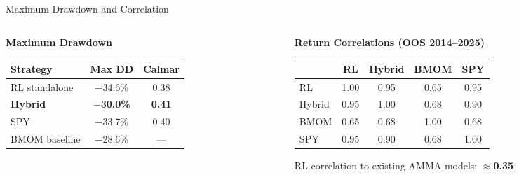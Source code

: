 \documentclass[aspectratio=169,11pt]{beamer}
\begin{document}
\begin{frame}{Maximum Drawdown and Correlation}
  \vspace{0.5em}
  \begin{columns}[T]
    \begin{column}{0.48\textwidth}
      \textbf{Maximum Drawdown}\\[0.4em]
      \begin{center}
      \begin{tabular}{lcc}
        \toprule
        Strategy & Max DD & Calmar \\
        \midrule
        RL standalone & $-$34.6\% & 0.38 \\
        \rowcolor{green!8}
        \textbf{Hybrid} & $-$\textbf{30.0\%} & \textbf{0.41} \\
        SPY & $-$33.7\% & 0.40 \\
        BMOM baseline & $-$28.6\% & --- \\
        \bottomrule
      \end{tabular}
      \end{center}
    \end{column}
    \begin{column}{0.48\textwidth}
      \textbf{Return Correlations (OOS 2014--2025)}\\[0.4em]
      \begin{center}
      \begin{tabular}{lcccc}
        \toprule
             & RL & Hybrid & BMOM & SPY \\
        \midrule
        RL     & 1.00 & 0.95 & 0.65 & 0.95 \\
        Hybrid & 0.95 & 1.00 & 0.68 & 0.90 \\
        BMOM   & 0.65 & 0.68 & 1.00 & 0.68 \\
        SPY    & 0.95 & 0.90 & 0.68 & 1.00 \\
        \bottomrule
      \end{tabular}
      \end{center}
      \vspace{0.4em}
      \small RL correlation to existing AMMA models: $\approx$\textbf{0.35}
    \end{column}
  \end{columns}
\end{frame}

\end{document}
